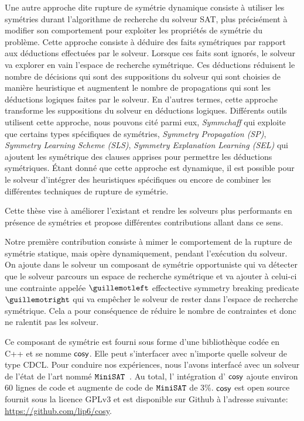 Une autre approche dite rupture de symétrie dynamique consiste à utiliser les symétries durant l'algorithme de recherche du solveur SAT, plus précisément à modifier son comportement pour exploiter les propriétés de symétrie du problème. Cette approche consiste à déduire des faits symétriques par rapport aux déductions effectuées par le solveur. Lorsque ces faits sont ignorés, le solveur va explorer en vain l'espace de recherche symétrique.
Ces déductions réduisent le nombre de décisions qui sont des suppositions du solveur qui sont choisies de 
manière heuristique et augmentent le nombre de propagations qui sont les déductions logiques faites par le solveur. 
En d'autres termes, cette approche transforme les suppositions du solveur en déductions logiques.
Différents outils utilisent cette approche, nous pouvons cité parmi eux, \textit{Symmchaff}
qui exploite que certains types spécifiques de symétries, \textit{Symmetry Propagation (SP)}, \textit{Symmetry Learning Scheme (SLS)}, \textit{Symmetry Explanation Learning (SEL)} qui ajoutent les symétrique des
clauses apprises pour permettre les déductions symétriques.
Étant donné que cette approche est dynamique, il est possible pour le solveur 
d'intégrer des heuristiques spécifiques ou encore de combiner les différentes techniques de rupture de symétrie.


Cette thèse vise à améliorer l'existant et rendre les solveurs plus performants en présence de symétries et
propose différentes contributions allant dans ce sens.  


Notre première contribution consiste à mimer le comportement de la rupture de symétrie statique, mais 
opère dynamiquement, pendant l'exécution du solveur. On ajoute dans le solveur un composant de symétrie opportuniste qui va détecter que le solveur parcours un espace de recherche symétrique et va ajouter à celui-ci une contrainte appelée $\guillemotleft$ effectective symmetry breaking predicate $\guillemotright$ qui va empêcher le solveur de rester dans
l'espace de recherche symétrique. Cela a pour conséquence de réduire le nombre de contraintes et donc 
ne ralentit pas les solveur.


Ce composant de symétrie est fourni sous forme d'une bibliothèque codée en C++ et se nomme $\textsf{cosy}$.
Elle peut s'interfacer avec n'importe quelle solveur de type CDCL. 
Pour conduire nos expériences, nous l'avons interfacé avec un solveur de l'état de l'art nommé $\texttt{MiniSAT}$~\cite{een2003extensible}. Au total, l' intégration d’ $\textsf{cosy}$ ajoute environ 60 lignes de code 
et augmente de code de $\texttt{MiniSAT}$ de 3\%.
$\textsf{cosy}$ est open source fournit sous la licence GPLv3 et est disponible sur Github à l'adresse suivante: \url{https://github.com/lip6/cosy}.


